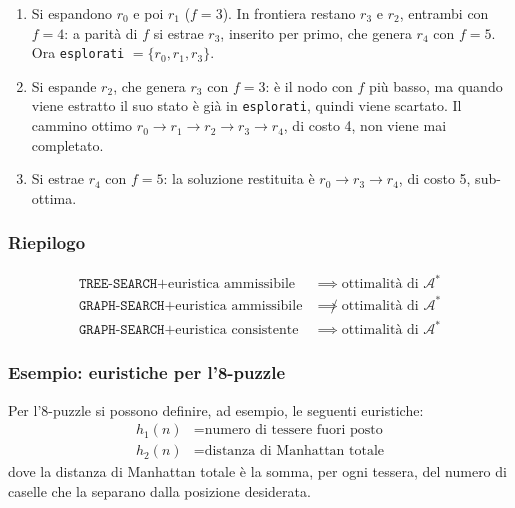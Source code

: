 \documentclass[a4paper, 11pt, oneside]{book}
\theoremstyle{definition}
\begin{document}
    \begin{enumerate}
        \item Si espandono $r_0$ e poi $r_1$ ($f = 3$). In frontiera restano $r_3$ e $r_2$,
            entrambi con $f = 4$: a parit\`a di $f$ si estrae $r_3$, inserito per primo, che
            genera $r_4$ con $f = 5$. Ora \texttt{esplorati} $= \{r_0, r_1, r_3\}$.

        \item Si espande $r_2$, che genera $r_3$ con $f = 3$: \`e il nodo con $f$ pi\`u basso,
            ma quando viene estratto il suo stato \`e gi\`a in \texttt{esplorati}, quindi viene
            scartato. Il cammino ottimo $r_0 \rightarrow r_1 \rightarrow r_2 \rightarrow r_3
            \rightarrow r_4$, di costo 4, non viene mai completato.

        \item Si estrae $r_4$ con $f = 5$: la soluzione restituita \`e $r_0 \rightarrow r_3
            \rightarrow r_4$, di costo 5, sub-ottima.
    \end{enumerate}

    \subsubsection*{Riepilogo}
    \begin{align*}
        \texttt{TREE-SEARCH}  + \text{euristica ammissibile} &\implies
            \text{ottimalit\`a di } \mathcal{A}^* \\
        \texttt{GRAPH-SEARCH} + \text{euristica ammissibile} &\not\implies
            \text{ottimalit\`a di } \mathcal{A}^* \\
        \texttt{GRAPH-SEARCH} + \text{euristica consistente} &\implies
            \text{ottimalit\`a di } \mathcal{A}^*
    \end{align*}

    \subsubsection*{Esempio: euristiche per l'8-puzzle}
    Per l'8-puzzle si possono definire, ad esempio, le seguenti euristiche:
    \begin{align*}
        h_1(n) &= \text{numero di tessere fuori posto} \\
        h_2(n) &= \text{distanza di Manhattan totale}
    \end{align*}
    dove la distanza di Manhattan totale \`e la somma, per ogni tessera, del numero di caselle
    che la separano dalla posizione desiderata.
\end{document}
